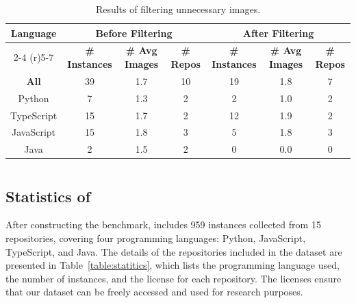 
\begin{table}[t]
  \centering
  \footnotesize
  \setlength\tabcolsep{1.5pt}
  \caption{Results of filtering unnecessary images.}
  \label{table:filteringProcess}
  \tabmargin
    \begin{tabular}{ccccccc}
    \toprule
    \multirow{2}{*}{\textbf{Language}} & \multicolumn{3}{c}{\textbf{Before Filtering}} & \multicolumn{3}{c}{\textbf{After Filtering}} \\
    \cmidrule(r){2-4} \cmidrule(r){5-7}
    & \textbf{\# Instances} & \textbf{\# Avg Images} & \textbf{\# Repos} & \textbf{\# Instances} & \textbf{\# Avg Images} & \textbf{\# Repos} \\
    \midrule
    
    \textbf{All} & 39  & 1.7 & 10 &  19 & 1.8 & 7 \\
    \midrule
    \quad Python & 7 & 1.3 & 2 & 2 & 1.0 & 2 \\
    \quad TypeScript  & 15 & 1.7 & 2 & 12 & 1.9 & 2 \\
    \quad JavaScript  & 15 & 1.8 & 3 & 5 & 1.8 & 3 \\
    \quad Java  & 2 & 1.5 & 2 & 0 & 0.0 & 0 \\

    

    \bottomrule
    \end{tabular}

\end{table}
\secmargin
\section{\Swebenchx}
\subsection{Statistics of \Swebenchx}
After constructing the benchmark, \Swebenchx includes 959 instances collected from 15 repositories, covering four programming languages: Python, JavaScript, TypeScript, and Java. The details of the repositories included in the dataset are presented in Table~\ref{table:statitics}, which lists the programming language used, the number of instances, and the license for each repository. The licenses ensure that our dataset can be freely accessed and used for research purposes.


